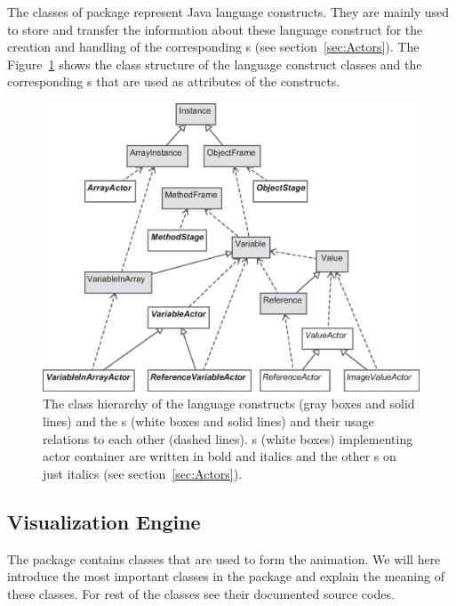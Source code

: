The classes of  package represent Java language constructs. They are mainly used to store and transfer the information about these language construct for the creation and handling of the corresponding s (see section~\ref{sec:Actors}). The Figure~\ref{fig:language_constructs_and_actors} shows the class structure of the language construct classes and the corresponding s that are used as attributes of the constructs.

\begin{figure}[!htb]
\begin{center}
\includegraphics[width=\textwidth]{images/language_constructs_and_actors.eps}
\caption{The class hierarchy of the language constructs (gray boxes and solid lines) and the s (white boxes and solid lines) and their usage relations to each other (dashed lines). s (white boxes) implementing actor container are written in bold and italics and the other s on just italics (see section~\ref{sec:Actors}).}
\label{fig:language_constructs_and_actors}
\end{center}
\end{figure}

\subsection{Visualization Engine}
\label{sec:Visualization_Engine}

The package  contains classes that are used to
form the animation. We will here introduce the most important
classes in the package and explain the meaning of these classes.
For rest of the classes see their documented source codes.

